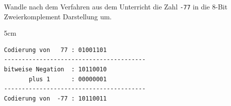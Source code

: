 \question[3]
Wandle nach dem Verfahren aus dem Unterricht die Zahl  \texttt{-77} in die 8-Bit Zweierkomplement Darstellung um.

\begin{solutionbox}{5cm}
\begin{lstlisting}
Codierung von   77 : 01001101
----------------------------------------
bitweise Negation  : 10110010
       plus 1      : 00000001
----------------------------------------
Codierung von  -77 : 10110011
\end{lstlisting}
\end{solutionbox}
